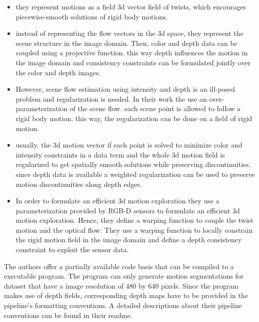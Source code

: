 \begin{itemize}
  \item they represent motions as a field 3d vector field of twists, which encourages piecewise-smooth solutions of rigid body motions.
  \item instead of representing the flow vectors in the 3d space, they represent the scene structure in the image domain. Then, color and depth data can be coupled using a projective function. this way depth influences the motion in the image domain and consistency constraints can be formulated jointly over the color and depth images. 
  \item However, scene flow estimation using intensity and depth is an ill-posed problem and regularization is needed. In their work the use an over-parameterization of the scene flow. each scene point is allowed to follow a rigid body motion. this way, the regularization can be done on a field of rigid motion.
  \item usually, the 3d motion vector if each point is solved to minimize color and intensity constraints in a data term and the whole 3d motion field is regularized to get spatially smooth solutions while preserving discontinuities. since depth data is available a weighted regularization can be used to preserve motion discontinuities along depth edges. 
  \item In order to formulate an efficient 3d motion exploration they use a parameterization provided by RGB-D sensors to formulate an efficient 3d motion exploration. Hence, they define a warping function to couple the twist motion and the optical flow. They use a warping function to locally constrain the rigid motion field in the image domain and define a depth consistency constraint to exploit the sensor data.
\end{itemize}
The authors offer a partially available code basis that can be compiled to a executable program. The program can only generate motion segmentations for dataset that have a image resolution of 480 by 640 pixels. Since the program makes use of depth fields, corresponding depth maps have to be provided in the pipeline's formatting conventions. A detailed descriptions about their pipeline conventions can be found in their readme. 

